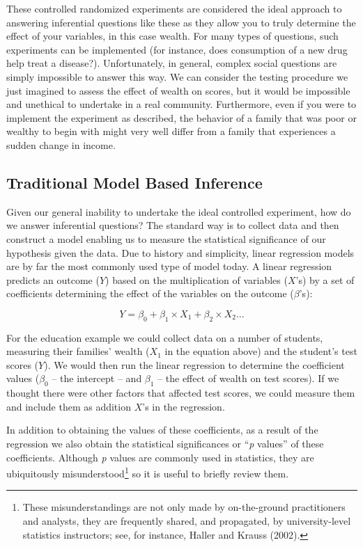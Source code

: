 \documentclass[]{memoir}
\begin{document}
These controlled randomized experiments are considered the ideal
approach to answering inferential questions like these as they allow you
to truly determine the effect of your variables, in this case wealth.
For many types of questions, such experiments can be implemented (for
instance, does consumption of a new drug help treat a disease?).
Unfortunately, in general, complex social questions are simply
impossible to answer this way. We can consider the testing procedure we
just imagined to assess the effect of wealth on scores, but it would be
impossible and unethical to undertake in a real community. Furthermore,
even if you were to implement the experiment as described, the behavior
of a family that was poor or wealthy to begin with might very well
differ from a family that experiences a sudden change in income.

\subsection{Traditional Model Based Inference}

Given our general inability to undertake the ideal controlled
experiment, how do we answer inferential questions? The standard way is
to collect data and then construct a model enabling us to measure the
statistical significance of our hypothesis given the data. Due to
history and simplicity, linear regression models are by far the most
commonly used type of model today. A linear regression predicts an
outcome ($Y$) based on the multiplication of variables ($X$'s) by a set
of coefficients determining the effect of the variables on the outcome
($\beta$'s):

\[ Y = \beta_0 + \beta_1 \times X_1 + \beta_2 \times X_2 ... \]

For the education example we could collect data on a number of students,
measuring their families' wealth ($X_1$ in the equation above) and the
student's test scores ($Y$). We would then run the linear regression to
determine the coefficient values ($\beta_0$ -- the intercept -- and
$\beta_1$ -- the effect of wealth on test scores). If we thought there
were other factors that affected test scores, we could measure them and
include them as addition $X$'s in the regression.

In addition to obtaining the values of these coefficients, as a result
of the regression we also obtain the statistical significances or
``\emph{p} values'' of these coefficients. Although \emph{p} values are
commonly used in statistics, they are ubiquitously
misunderstood\footnote{These misunderstandings are not only made by
  on-the-ground practitioners and analysts, they are frequently shared,
  and propagated, by university-level statistics instructors; see, for
  instance, Haller and Krauss (2002).} so it is useful to briefly review
them.
\end{document}
